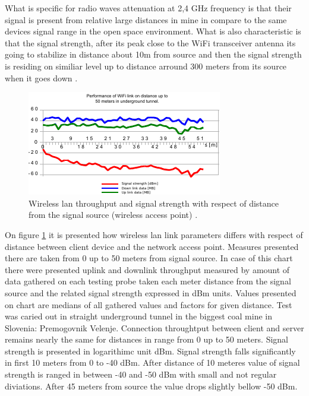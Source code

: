 \documentclass[../main.tex]{subfiles}
\begin{document}
What is specific for radio waves attenuation at 2,4 GHz frequency is that their signal is present from relative large distances in mine in compare to the same devices signal range in the open space environment. What is also characteristic is that the signal strength, after its peak close to the WiFi transceiver antenna its going to stabilize in distance about 10m from source and then the signal strength is residing on similiar level up to distance arround 300 meters from its source when it goes down \cite{Thesis_CM}.

\begin{figure}[ht]
\includegraphics[width=\textwidth]{pictures/wifi_link_short.pdf}
\centering
\caption{Wireless lan throughput and signal strength with respect of distance from the signal source (wireless access point) \cite{Thesis_CM}. }
\label{fig:wifi_link_short}
\end{figure}


On figure \ref{fig:wifi_link_short} it is presented how wireless lan link parameters differs with respect of distance between client device and the network access point. Measures presented there are taken from 0 up to 50 meters from signal source. In case of this chart there were presented uplink and downlink throughput measured by amount of data gathered on each testing probe taken each meter distance from the signal source and the related signal strength expressed in dBm units. Values presented on chart are medians of all gathered values and factors for given distance. Test was caried out in straight underground tunnel in the biggest coal mine in Slovenia: Premogovnik Velenje. Connection throughtput between client and server remains nearly the same for distances in range from 0 up to 50 meters. Signal strength is presented in logarithimc unit dBm. Signal strength falls significantly in first 10 meters from 0 to -40 dBm. After distance of 10 meteres value of signal strength is ranged in between -40 and -50 dBm with small and not regular diviations. After 45 meters from source the value drops slightly bellow -50 dBm.
\end{document}
